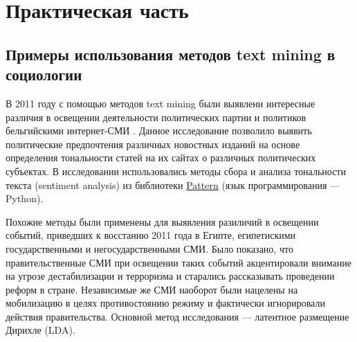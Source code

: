 \chapter{Практическая часть} \label{chapt2}
\section{Примеры использования методов text mining в социологии} \label{}
В 2011 году с помощью методов text mining были выявлени интересные различия в освещении деятельности политических партии и политиков бельгийскими интернет-СМИ \cite{MediaCoverage2012}. Данное исследование позволило выявить политические предпочтения различных новостных изданий на основе определения тональности статей на их сайтах о различных политических субъектах. В исследовании использовались методы сбора и анализа тональности текста (sentiment analysis) из библиотеки \href{http://www.clips.ua.ac.be/pages/pattern}{Pattern} (язык программирования --- Python).

Похожие методы были применены для выявления разиличий в освещении событий, приведших к восстанию 2011 года в Египте, египетискими государственными и негосударственными СМИ. Было показано, что правительственные СМИ при освещении таких событий акцентировали внимание на угрозе дестабилизации и терроризма и старались рассказывать проведении реформ в стране. Независимые же СМИ наоборот были нацелены на мобилизацию в целях противостоянию режиму и фактически игнорировали действия правительства. Основной метод исследования --- латентное размещение Дирихле (LDA).



\clearpage